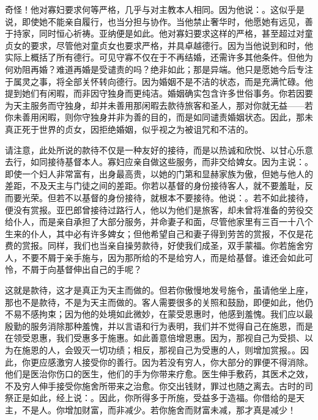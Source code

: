 奇怪！他对寡妇要求何等严格，几乎与对主教本人相同。因为他说：。这似乎是说，即使她不能亲自履行，也当分担与协作。当他禁止奢华时，他愿她有远见，善于持家，同时恒心祈祷。亚纳便是如此。他对寡妇要求这样的严格，甚至超过对童贞女的要求，尽管他对童贞女也要求严格，并具卓越德行。因为当他说到和时，他实际上概括了所有德行。可见守寡不仅在于不再结婚，还需许多其他条件。但他为何劝阻再婚？难道再婚是受谴责的吗？绝非如此；那是异端。他只是愿她今后专注于属灵之事，将全部关怀转向德行。因为婚姻不是不洁的状态，而是充满忙碌。他提到她们有闲暇，而非因守独身而更纯洁。婚姻确实包含许多世俗事务。你若因要为天主服务而守独身，却并未善用那闲暇去款待旅客和圣人，那对你就无益——若你未善用闲暇，则你守独身并非为善的目的，而是如同谴责婚姻状态。因此，那未真正死于世界的贞女，因拒绝婚姻，似乎视之为被诅咒和不洁的。\par

请注意，此处所说的款待不仅是一种友好的接待，而是以热诚和欣悦、以甘心乐意去行，如同接待基督本人。寡妇应亲自做这些服务，而非交给婢女。因为主说：。即使一个妇人非常富有，出身最高贵，以她的门第和显赫家族为傲，但她与他人的差距，不及天主与门徒之间的差距。你若以基督的身份接待客人，就不要羞耻，反而要光荣。但若不以基督的身份接待，就根本不要接待。他说：。若不如此接待，便没有赏报。亚巴郎曾接待过路行人，他以为他们是旅客，却未曾将准备的劳役交给仆人，而是亲自承担了大部分服务，并命妻子和面，尽管他家里有三百一十八个生来的仆人，其中必有许多婢女；但他希望自己和妻子得到劳苦的赏报，不仅是花费的赏报。同样，我们也当亲自操劳款待，好使我们成圣，双手蒙福。你若施舍穷人，不要不屑于亲手施与，因为那所给的不是给穷人，而是给基督。谁还会如此可怜，不屑于向基督伸出自己的手呢？\par

这就是款待，这才是真正为天主而做的。但若你傲慢地发号施令，虽请他坐上座，那也不是款待，不是为天主而做的。客人需要很多的关照和鼓励，即便如此，他仍不易不感拘束；因为他的处境如此微妙，在蒙受恩惠时，他感到羞愧。我们应以最殷勤的服务消除那种羞愧，并以言语和行为表明，我们并不觉得自己在施恩，而是在领受恩惠，我们受惠多于施惠。如此善意倍增恩惠。因为，那视自己为受损、以为在施恩的人，会毁灭一切功绩；相反，那视自己为受惠的人，则增加赏报。。因此，你更应感激穷人接受你的善行。因为若没有穷人，你大部分的罪便不得消除。他们是医治你伤口的医生，他们的手为你带来疗愈。医生伸手敷药，其医术之效，不及穷人伸手接受你施舍所带来之治愈。你交出钱财，罪过也随之离去。古时的司祭正是如此，经上说：。因此，你所得多于所施，受益多于造福。你借给的是天主，不是人。你增加财富，而非减少。若你施舍而财富未减，那才真是减少！\par

